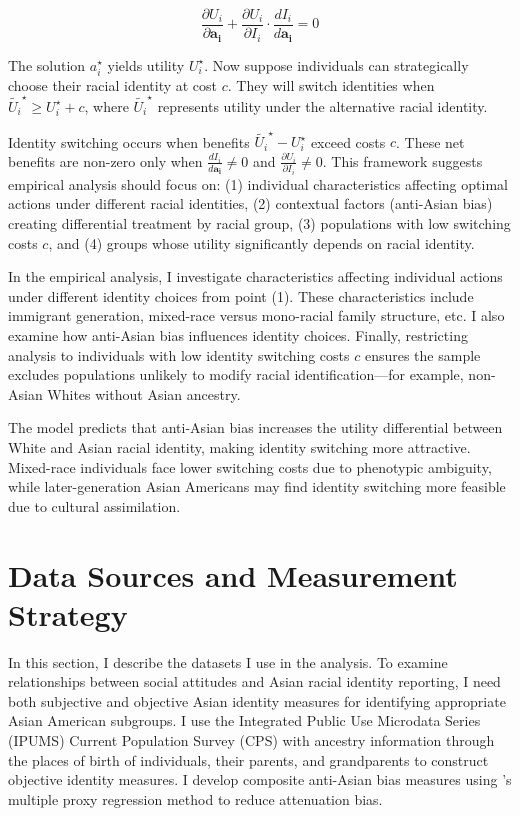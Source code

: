 \begin{equation}
\frac{\partial U_i}{\partial \pmb{a_i}} + \frac{\partial U_i}{\partial I_i} \cdot \frac{d I_i}{d \pmb{a_i}} = 0\label{eq:foc}
\end{equation}

The solution $a_{i}^{\star}$ yields utility $U_{i}^{\star}$. Now suppose individuals can strategically choose their racial identity at cost $c$. They will switch identities when $\tilde{U_{i}}^{\star} \geq U_{i}^{\star} + c$, where $\tilde{U_{i}}^{\star}$ represents utility under the alternative racial identity.

Identity switching occurs when benefits $\tilde{U_{i}}^{\star} - U_{i}^{\star}$ exceed costs $c$. These net benefits are non-zero only when $\frac{d I_i}{d \pmb{a_i}} \neq 0$ and $\frac{\partial U_i}{\partial I_i} \neq 0$. This framework suggests empirical analysis should focus on: (1) individual characteristics affecting optimal actions under different racial identities, (2) contextual factors (anti-Asian bias) creating differential treatment by racial group, (3) populations with low switching costs $c$, and (4) groups whose utility significantly depends on racial identity.

In the empirical analysis, I investigate characteristics affecting individual actions under different identity choices from point (1). These characteristics include immigrant generation, mixed-race versus mono-racial family structure, etc. I also examine how anti-Asian bias influences identity choices. Finally, restricting analysis to individuals with low identity switching costs $c$ ensures the sample excludes populations unlikely to modify racial identification---for example, non-Asian Whites without Asian ancestry.

The model predicts that anti-Asian bias increases the utility differential between White and Asian racial identity, making identity switching more attractive. Mixed-race individuals face lower switching costs due to phenotypic ambiguity, while later-generation Asian Americans may find identity switching more feasible due to cultural assimilation.

\section{Data Sources and Measurement Strategy}\label{sec:data}

In this section, I describe the datasets I use in the analysis. To examine relationships between social attitudes and Asian racial identity reporting, I need both subjective and objective Asian identity measures for identifying appropriate Asian American subgroups. I use the Integrated Public Use Microdata Series (IPUMS) Current Population Survey (CPS) \autocite{floodsarahIntegratedPublicUse2021a} with ancestry information through the places of birth of individuals, their parents, and grandparents to construct objective identity measures. I develop composite anti-Asian bias measures using \textcite{lubotskyInterpretationRegressionsMultiple2006}'s multiple proxy regression method to reduce attenuation bias.

